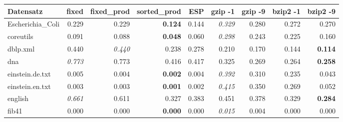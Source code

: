 \documentclass[10pt,a4paper]{standalone}
\begin{document}
\begin{tabular}{|l||r|r|r|r|r|r|r|r|}
	\hline
	Datensatz & fixed & fixed\_prod & sorted\_prod & ESP & gzip -1 & gzip -9 & bzip2 -1 & bzip2 -9 \\ \hline\hline
Escherichia\_Coli &        0.229 &        0.229 & \textbf{0.124} & 0.144 & \emph{0.329} & 0.280 & 0.272 &          0.270 \\
      coreutils &        0.091 &        0.088 & \textbf{0.048} & 0.060 & \emph{0.298} & 0.243 & 0.225 &          0.160 \\
       dblp.xml &        0.440 & \emph{0.440} &          0.238 & 0.278 &        0.210 & 0.170 & 0.144 & \textbf{0.114} \\
            dna & \emph{0.773} &        0.773 &          0.416 & 0.417 &        0.325 & 0.269 & 0.264 & \textbf{0.258} \\
einstein.de.txt &        0.005 &        0.004 & \textbf{0.002} & 0.004 & \emph{0.392} & 0.310 & 0.235 &          0.043 \\
einstein.en.txt &        0.003 &        0.003 & \textbf{0.001} & 0.002 & \emph{0.415} & 0.350 & 0.269 &          0.052 \\
        english & \emph{0.661} &        0.611 &          0.327 & 0.383 &        0.451 & 0.378 & 0.329 & \textbf{0.284} \\
          fib41 &        0.000 &        0.000 & \textbf{0.000} & 0.000 & \emph{0.015} & 0.004 & 0.000 &          0.000 \\

\end{tabular}
\end{document}
